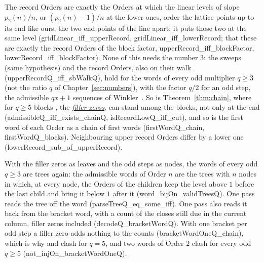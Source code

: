 \documentclass[10pt,a4paper,titlepage]{article}
\makeatletter
\newcommand{\termhere}[1]{\leavevmode
  \Hy@raisedlink{\hyper@anchorstart{term:#1}\hyper@anchorend}}
\newcommand{\keyterm}[2]{\hyperlink{box:#1}{\emph{#2}}}
\newcommand{\lean}[1]{\textsf{#1}}
\makeatother
\begin{document}
The record Orders are exactly the Orders at which the linear levels of
slope $p_2(n)/n$, or $(p_2(n) - 1)/n$ at the lower ones, order the lattice points
up to its end like ours, the two end points of the line apart: it puts those two at the same
level (\lean{gridLinear\_iff\_upperRecord},
\lean{gridLinear\_iff\_lowerRecord}; that these are exactly the record Orders of the block
factor, \lean{upperRecord\_iff\_blockFactor}, \lean{lowerRecord\_iff\_blockFactor}).
None of this needs the number $3$: the sweeps (same hypothesis) and the record Orders, also on
their walk (\lean{upperRecordQ\_iff\_sbWalkQ}), hold
for the words of every odd multiplier $q \ge 3$ (not the ratio $q$ of Chapter~\ref{sec:numbers}), with the factor $q/2$ for an odd step, the
admissible $qx+1$ sequences of Winkler~\cite{Winkler2026b}. \termhere{fillerzero}So is Theorem~\ref{thm:chain}, where for $q \ge 5$ blocks , the \keyterm{fillerzero}{filler zeros}, can
stand among the blocks, not only at the end (\lean{admissibleQ\_iff\_exists\_chainQ},
\lean{isRecordLowQ\_iff\_cut}), and so
is the first word of each Order as a chain of first words (\lean{firstWordQ\_chain},
\lean{firstWordQ\_blocks}). Neighbouring
upper record Orders differ by a lower one (\lean{lowerRecord\_sub\_of\_upperRecord}).

With the filler zeros as leaves and the odd steps as nodes, the words of every odd $q \ge 3$
are trees again: the admissible words of Order $n$ are the trees with $n$ nodes in which,
at every node, the Orders of the children keep the level above $1$ before the last child
and bring it below $1$ after it (\lean{word\_bijOn\_validTreesQ}). One pass reads the
tree off the word (\lean{parseTreeQ\_eq\_some\_iff}). One pass also reads it back from the
bracket word, with a count of the closes still due in the current column, filler zeros
included (\lean{decodeQ\_bracketWordQ}). With one bracket per odd step a filler zero adds
nothing to the counts (\lean{bracketWordOneQ\_chain}), which is why  and
 clash for $q = 5$, and two words of Order $2$ clash for every odd $q \ge 5$
(\lean{not\_injOn\_bracketWordOneQ}).
\end{document}
